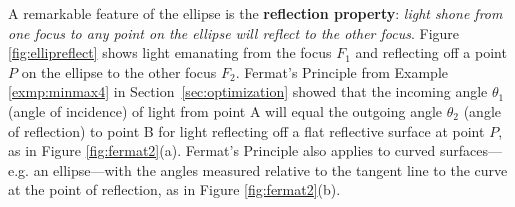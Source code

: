 \piccaption[]{\label{fig:ellipreflect}}
A remarkable feature of the ellipse is the \textbf{reflection property}:
\emph{light shone from one focus to any point on the ellipse will reflect to the
other focus}. Figure \ref{fig:ellipreflect}
shows light emanating from the focus $F_1$ and reflecting off a point $P$ on the
ellipse to the other focus $F_2$. Fermat's Principle from Example
\ref{exmp:minmax4} in Section~\ref{sec:optimization} showed that the incoming angle $\theta_1$
(angle of incidence) of light from point A will equal the outgoing angle
$\theta_2$ (angle of reflection) to point B for light reflecting off a flat
reflective surface at point $P$, as in Figure \ref{fig:fermat2}(a). Fermat's
Principle also applies to curved surfaces---e.g. an ellipse---with the angles
measured relative to the tangent line to the curve at the point of reflection,
as in Figure \ref{fig:fermat2}(b).

